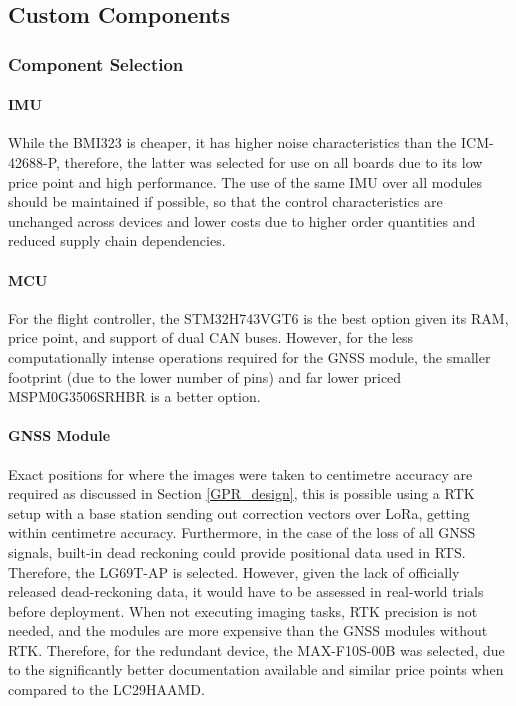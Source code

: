 \subsection{Custom Components}\label{sub_sub_section:tgt_custom_components}

\subsubsection{Component Selection}\label{sub_sub_section:tgt_component_selection}

\paragraph{\gls{IMU}}
While the BMI323 is cheaper, it has higher noise characteristics than the ICM-42688-P, therefore, the latter was selected for use on all boards due to its low price point and high performance. The use of the same \gls{IMU} over all modules should be maintained if possible, so that the control characteristics are unchanged across devices and lower costs due to higher order quantities and reduced supply chain dependencies.
\paragraph{\gls{MCU}}

For the flight controller, the STM32H743VGT6 is the best option given its \gls{RAM}, price point, and support of dual \gls{CAN} buses. However, for the less computationally intense operations required for the \gls{GNSS} module, the smaller footprint (due to the lower number of pins) and far lower priced MSPM0G3506SRHBR is a better option.
\paragraph{\gls{GNSS} Module}

Exact positions for where the images were taken to centimetre accuracy are required as discussed in Section \ref{GPR_design}, this is possible using a \gls{RTK} setup with a base station sending out correction vectors over LoRa, getting within centimetre accuracy\cite{RTK_LORA}. Furthermore, in the case of the loss of all \gls{GNSS} signals, built-in dead reckoning could provide positional data used in \gls{RTS}.  Therefore, the LG69T-AP is selected. However, given the lack of officially released dead-reckoning data, it would have to be assessed in real-world trials before deployment. When not executing imaging tasks, \gls{RTK} precision is not needed, and the modules are more expensive than the \gls{GNSS} modules without \gls{RTK}. Therefore, for the redundant device, the MAX-F10S-00B was selected,  due to the significantly better documentation available and similar price points when compared to the LC29HAAMD.

